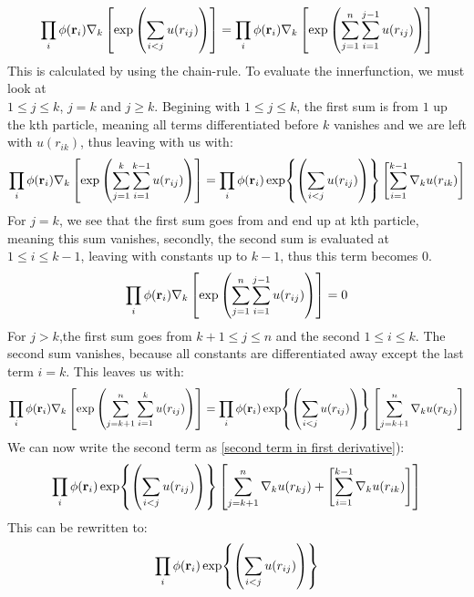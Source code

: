 \documentclass[a4paper, 10pt]{article}
\begin{document}
\begin{appendices}
\begin{align}
		\prod_{i}\phi(\bold{r}_{i})\nabla_{k}\left[\exp\left(\sum_{i < j}u(r_{ij})\right)\right]
		= \prod_{i}\phi(\bold{r}_{i})\nabla_{k}\left[\exp\left(\sum_{j = 1}^{n}\sum_{i = 1}^{j-1}u(r_{ij})\right)\right]
		\label{second term in first derivative}
		\end{align}
		This is calculated by using the chain-rule. To evaluate the innerfunction, we must look
		at \\$1 \le j \le k$, $j = k$ and $j \ge k$. Begining with $1\le  j \le k$,
		the first sum is from $1$ up the kth particle, meaning all terms differentiated before $k$ vanishes
		and we are left with $u(r_{ik})$, thus leaving with us with:
		\begin{align}
		\prod_{i}\phi(\bold{r}_{i})\nabla_{k}\left[\exp\left(\sum_{j = 1}^{k}\sum_{i = 1}^{k-1}u(r_{ij})\right)\right]
		=
		\prod_{i}\phi(\bold{r}_{i})\exp{\left(\sum_{i<j}u(r_{ij})\right)}
		\left[\sum_{i = 1}^{k-1}\nabla_{k}u(r_{ik})\right]
		\end{align}
		For $j = k$, we see that the first sum goes from and end up at kth particle, meaning
		this sum vanishes, secondly, the second sum is evaluated at $1 \le i \le k-1$, leaving with
		constants up to $k-1$, thus this term becomes $0$.
		\begin{align}
		\prod_{i}\phi(\bold{r}_{i})\nabla_{k}\left[\exp\left(\sum_{j = 1}^{n}\sum_{i = 1}^{j-1}u(r_{ij})\right)\right]
		= 0
		\end{align}
		For $j > k$,the first sum goes from $k+1\le j \le n$ and the second $1 \le i \le k$.  The second sum vanishes, because all constants are differentiated away
		except the last term $i = k$. This leaves us with:
		\begin{align}
		\prod_{i}\phi(\bold{r}_{i})\nabla_{k}\left[\exp\left(\sum_{j = k+1}^{n}\sum_{i = 1}^{k}u(r_{ij})\right)\right]
		= \prod_{i}\phi(\bold{r}_{i})
		\exp{\left(\sum_{i<j}u(r_{ij})\right)}
		\left[\sum_{j = k + 1}^{n}\nabla_{k}u(r_{kj})\right]
		\end{align}
		We can now write the second term as \ref{second term in first derivative}):
		\begin{align}\label{combined sum}
		\prod_{i}\phi(\bold{r}_{i})
		\exp{\left(\sum_{i<j}u(r_{ij})\right)}
		\left[\sum_{j = k + 1}^{n}\nabla_{k}u(r_{kj}) +
		\left[\sum_{i = 1}^{k-1}\nabla_{k}u(r_{ik})\right]\right]
		\end{align}
		This can be rewritten to:
		\begin{align}
		\prod_{i}\phi(\bold{r}_{i})
		\exp{\left(\sum_{i<j}u(r_{ij})\right)}

\end{align}
\end{appendices}
\end{document}
